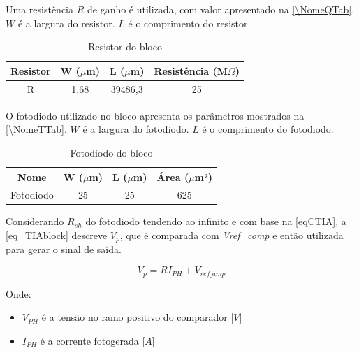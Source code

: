 Uma resist\^encia $R$ de ganho \'e utilizada, com valor apresentado na \autoref{\NomeQTab}. $W$ é a largura do resistor. $L$ é o comprimento do resistor.

\begin{table}[!h]
\caption{Resistor do bloco \NomeBloco}
\label{\NomeQTab}
\centering
\begin{tabular}{cccc}
\toprule
Resistor & W ($\mu$m)  & L ($\mu$m) & Resist\^encia (M$\Omega$)\\
\midrule \midrule
R & 1,68 & 39486,3 & 25\\
\bottomrule
\end{tabular}
\end{table}

O fotodiodo utilizado no bloco apresenta os par\^ametros mostrados na \autoref{\NomeTTab}. $W$ é a largura do fotodiodo. $L$ é o comprimento do fotodiodo.

\begin{table}[!h]
\caption{Fotodiodo do bloco \NomeBloco}
\label{\NomeTTab}
\centering
\begin{tabular}{cccc}
\toprule
Nome & W ($\mu$m)  & L ($\mu$m) & Área ($\mu$m²)\\
\midrule \midrule
Fotodiodo & 25 & 25 & 625\\
\bottomrule
\end{tabular}
\end{table}

Considerando $R_{sh}$ do fotodiodo tendendo ao infinito e com base na \autoref{eqCTIA}, a \autoref{eq_TIAblock} descreve $V_{p}$, que \'e comparada com \textit{Vref\_comp} e então utilizada para gerar o sinal de sa\'ida.

\begin{equation}
    \label{eq_TIAblock}
    V_{p} = RI_{PH} + V_{ref\_amp}
\end{equation}

Onde:

\begin{itemize}

    \item \textit{$V_{PH}$} \'e a tensão no ramo positivo do comparador [$V$]
    \item \textit{$I_{PH}$} \'e a corrente fotogerada [$A$]
    
\end{itemize}